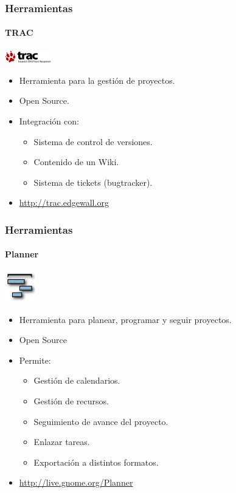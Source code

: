 \begin{frame}
\frametitle{Herramientas}
\framesubtitle{TRAC}
\begin{center}
	\includegraphics[width=0.15\textwidth]{img/trac}
\end{center}
\begin{itemize}
    \item Herramienta para la gestión de proyectos.
	\item Open Source.
	\item Integración con:
	 \begin{itemize}
	 	\item Sistema de control de versiones.
		\item Contenido de un Wiki.
		\item Sistema de tickets (bugtracker).
	 \end{itemize}
	\item \url{http://trac.edgewall.org}
\end{itemize}
\end{frame}

\begin{frame}
\frametitle{Herramientas}
\framesubtitle{Planner}
\begin{center}
	\includegraphics[width=0.1\textwidth]{img/planner}
\end{center}
\begin{itemize}
    \item Herramienta para planear, programar y seguir proyectos.
	\item Open Source
	\item Permite:
	\begin{itemize}
		\item Gestión de calendarios.
		\item Gestión de recursos.
		\item Seguimiento de avance del proyecto.
		\item Enlazar tareas.
		\item Exportación  a distintos formatos.
	\end{itemize}
	\item \url{http://live.gnome.org/Planner}
\end{itemize}
\end{frame}

